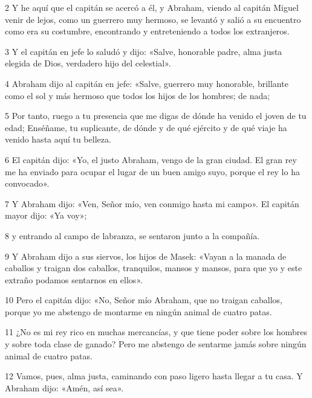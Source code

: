 \par 2 Y he aquí que el capitán se acercó a él, y Abraham, viendo al capitán Miguel venir de lejos, como un guerrero muy hermoso, se levantó y salió a su encuentro como era su costumbre, encontrando y entreteniendo a todos los extranjeros.

\par 3 Y el capitán en jefe lo saludó y dijo: «Salve, honorable padre, alma justa elegida de Dios, verdadero hijo del celestial».

\par 4 Abraham dijo al capitán en jefe: «Salve, guerrero muy honorable, brillante como el sol y más hermoso que todos los hijos de los hombres; de nada;

\par 5 Por tanto, ruego a tu presencia que me digas de dónde ha venido el joven de tu edad; Enséñame, tu suplicante, de dónde y de qué ejército y de qué viaje ha venido hasta aquí tu belleza.

\par 6 El capitán dijo: «Yo, el justo Abraham, vengo de la gran ciudad. El gran rey me ha enviado para ocupar el lugar de un buen amigo suyo, porque el rey lo ha convocado».

\par 7 Y Abraham dijo: «Ven, Señor mío, ven conmigo hasta mi campo». El capitán mayor dijo: «Ya voy»;

\par 8 y entrando al campo de labranza, se sentaron junto a la compañía.

\par 9 Y Abraham dijo a sus siervos, los hijos de Masek: «Vayan a la manada de caballos y traigan dos caballos, tranquilos, mansos y mansos, para que yo y este extraño podamos sentarnos en ellos».

\par 10 Pero el capitán dijo: «No, Señor mío Abraham, que no traigan caballos, porque yo me abstengo de montarme en ningún animal de cuatro patas.

\par 11 ¿No es mi rey rico en muchas mercancías, y que tiene poder sobre los hombres y sobre toda clase de ganado? Pero me abstengo de sentarme jamás sobre ningún animal de cuatro patas.

\par 12 Vamos, pues, alma justa, caminando con paso ligero hasta llegar a tu casa. Y Abraham dijo: «Amén, así sea».


